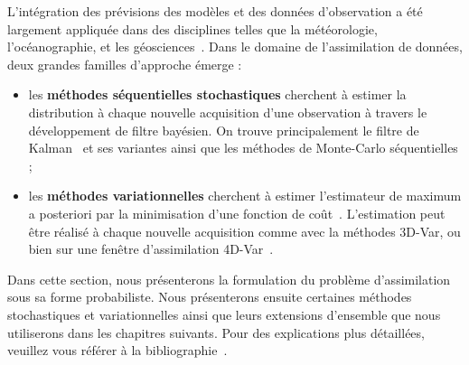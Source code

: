 L'intégration des prévisions des modèles et des données d'observation a été largement appliquée dans des disciplines telles que la météorologie, l'océanographie, et les géosciences~\cite{bocquet_introduction_2014}. Dans le domaine de l'assimilation de données, deux grandes familles d'approche émerge :

\begin{itemize}
    \item les \textbf{méthodes séquentielles stochastiques} cherchent à estimer la distribution à chaque nouvelle acquisition d'une observation à travers le développement de filtre bayésien. On trouve principalement le filtre de Kalman~\cite{kalman_new_1960} et ses variantes ainsi que les méthodes de Monte-Carlo séquentielles ;
    \item les \textbf{méthodes variationnelles} cherchent à estimer l'estimateur de maximum a posteriori par la minimisation d'une fonction de coût~\cite{variational_method}. L'estimation peut être réalisé à chaque nouvelle acquisition comme avec la méthodes 3D-Var, ou bien sur une fenêtre d'assimilation 4D-Var~\cite{talagrand1997assimilation}.
\end{itemize}


Dans cette section, nous présenterons la formulation du problème d'assimilation sous sa forme probabiliste. Nous présenterons ensuite certaines méthodes stochastiques et variationnelles ainsi que leurs extensions d'ensemble que nous utiliserons dans les chapitres suivants. Pour des explications plus détaillées, veuillez vous référer à la bibliographie~\cite{law_data_2015,asch_data_2016,evensen_data_2022}.


